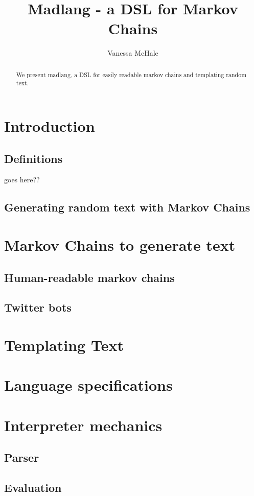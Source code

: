 \documentclass{article}
\theoremstyle{plain}
\begin{document}
\title{Madlang - a DSL for Markov Chains}
\author{Vanessa McHale}
\maketitle

\begin{abstract}
We present madlang, a DSL for easily readable markov chains and templating
random text.
\end{abstract}

\tableofcontents

\section{Introduction}

\subsection{Definitions}

\newtheorem{defin}[theo]{Definition} goes here??

\subsection{Generating random text with Markov Chains}


\section{Markov Chains to generate text}

\subsection{Human-readable markov chains}

\subsection{Twitter bots}

\section{Templating Text}

\begin{appendices}
    \section{Language specifications}

    \section{Interpreter mechanics}
    
    \subsection{Parser}

    \subsection{Evaluation}
\end{appendices}

\end{document}
